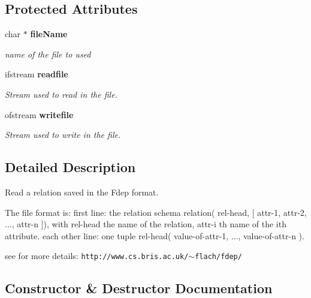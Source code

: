 \subsection*{Protected Attributes}
\begin{CompactItemize}
\item 
char $\ast$ {\bf file\-Name}\label{class_fdep_file_782e7766a7e9d68e8e84fafb61091817}

\begin{CompactList}\small\item\em name of the file to used \item\end{CompactList}\item 
ifstream {\bf readfile}\label{class_fdep_file_304ecc5605a362550142890ad870e75d}

\begin{CompactList}\small\item\em Stream used to read in the file. \item\end{CompactList}\item 
ofstream {\bf writefile}\label{class_fdep_file_47977170ade83f313f6755a0ead51056}

\begin{CompactList}\small\item\em Stream used to write in the file. \item\end{CompactList}\end{CompactItemize}


\subsection{Detailed Description}
Read a relation saved in the Fdep format. 

The file format is: first line: the relation schema relation( rel-head, [ attr-1, attr-2, ..., attr-n ]), with rel-head the name of the relation, attr-i th name of the ith attribute. each other line: one tuple rel-head( value-of-attr-1, ..., value-of-attr-n ).

see for more details: {\tt http://www.cs.bris.ac.uk/$\sim$flach/fdep/} 



\subsection{Constructor \& Destructor Documentation}
